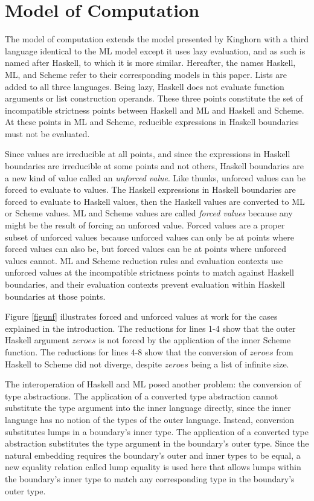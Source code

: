 \section{Model of Computation}

The model of computation extends the model presented by Kinghorn \cite{kinghorn07} with a third language identical to the ML model except it uses lazy evaluation, and as such is named after Haskell, to which it is more similar. Hereafter, the names Haskell, ML, and Scheme refer to their corresponding models in this paper. Lists are added to all three languages. Being lazy, Haskell does not evaluate function arguments or list construction operands. These three points constitute the set of incompatible strictness points between Haskell and ML and Haskell and Scheme. At these points in ML and Scheme, reducible expressions in Haskell boundaries must not be evaluated.

Since values are irreducible at all points, and since the expressions in Haskell boundaries are irreducible at some points and not others, Haskell boundaries are a new kind of value called an \emph{unforced value}. Like thunks, unforced values can be forced to evaluate to values. The Haskell expressions in Haskell boundaries are forced to evaluate to Haskell values, then the Haskell values are converted to ML or Scheme values. ML and Scheme values are called \emph{forced values} because any might be the result of forcing an unforced value. Forced values are a proper subset of unforced values because unforced values can only be at points where forced values can also be, but forced values can be at points where unforced values cannot. ML and Scheme reduction rules and evaluation contexts use unforced values at the incompatible strictness points to match against Haskell boundaries, and their evaluation contexts prevent evaluation within Haskell boundaries at those points.

Figure \ref{figunf} illustrates forced and unforced values at work for the cases explained in the introduction. The reductions for lines 1-4 show that the outer Haskell argument $zeroes$ is not forced by the application of the inner Scheme function. The reductions for lines 4-8 show that the conversion of $zeroes$ from Haskell to Scheme did not diverge, despite $zeroes$ being a list of infinite size.



The interoperation of Haskell and ML posed another problem: the conversion of type abstractions. The application of a converted type abstraction cannot substitute the type argument into the inner language directly, since the inner language has no notion of the types of the outer language. Instead, conversion substitutes lumps in a boundary's inner type. The application of a converted type abstraction substitutes the type argument in the boundary's outer type. Since the natural embedding \cite{matthews07} requires the boundary's outer and inner types to be equal, a new equality relation called lump equality is used here that allows lumps within the boundary's inner type to match any corresponding type in the boundary's outer type.

